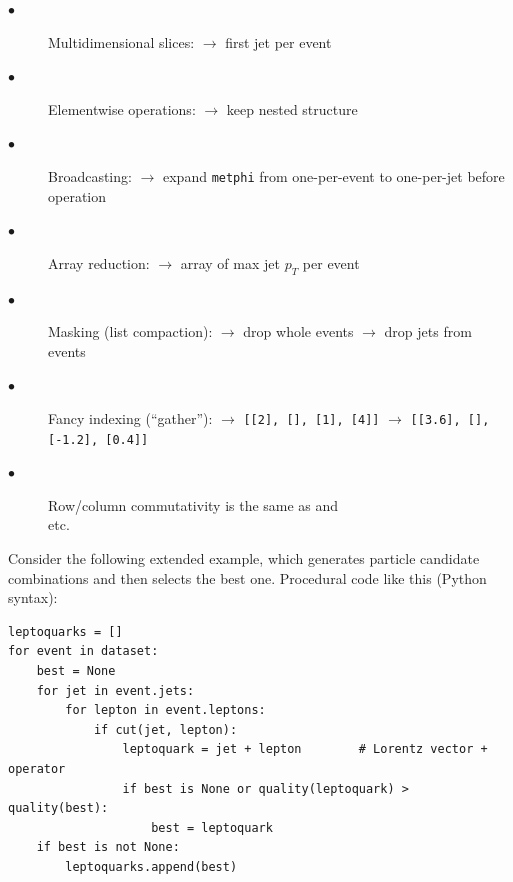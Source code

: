 \documentclass{webofc}
\begin{document}
\begin{description}
\item[\hspace{1 cm}$\bullet$] Multidimensional slices:  $\to$ first jet per event
\item[\hspace{1 cm}$\bullet$] Elementwise operations:  $\to$ keep nested structure
\item[\hspace{1 cm}$\bullet$] Broadcasting:  $\to$ expand {\small \texttt{metphi}} from
\tabto{5.8 cm}one-per-event to one-per-jet before operation
\item[\hspace{1 cm}$\bullet$] Array reduction:  $\to$ array of max jet $p_T$ per event
\item[\hspace{1 cm}$\bullet$] Masking (list compaction):  $\to$ drop whole events
 $\to$ drop jets from events  
\item[\hspace{1 cm}$\bullet$] Fancy indexing (``gather''):  $\to$ {\small \texttt{[[2], [], [1], [4]]}}
 $\to$ \mbox{\small \texttt{[[3.6], [], [-1.2], [0.4]]}\hspace{-0.5 cm}}
\item[\hspace{1 cm}$\bullet$] Row/column commutativity  is the same as
 and \\
 etc.
\end{description}

\noindent Consider the following extended example, which generates particle candidate combinations and then selects the best one. Procedural code like this (Python syntax):

{\small\begin{verbatim}
leptoquarks = []
for event in dataset:
    best = None
    for jet in event.jets:
        for lepton in event.leptons:
            if cut(jet, lepton):
                leptoquark = jet + lepton        # Lorentz vector + operator
                if best is None or quality(leptoquark) > quality(best):
                    best = leptoquark
    if best is not None:
        leptoquarks.append(best)
\end{verbatim}
}
\end{document}
